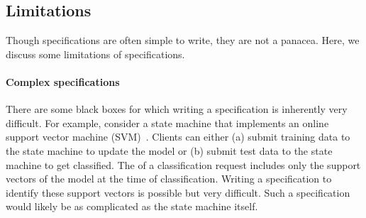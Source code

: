 \subsection{Limitations}
Though \watprovenance{} specifications are often simple to write, they are not
a panacea. Here, we discuss some limitations of \watprovenance{}
specifications.

\paragraph{Complex \watprovenance{} specifications}
There are some black boxes for which writing a \watprovenance{} specification
is inherently very difficult. For example, consider a state machine that
implements an online support vector machine (SVM)~\cite{hearst1998support,
laskov2006incremental, bordes12huller}. Clients can either (a) submit training
data to the state machine to update the model or (b) submit test data to the
state machine to get classified. The \watprovenance{} of a classification
request includes only the support vectors of the model at the time of
classification. Writing a \watprovenance{} specification to identify these
support vectors is possible but very difficult. Such a \watprovenance{}
specification would likely be as complicated as the state machine itself.



